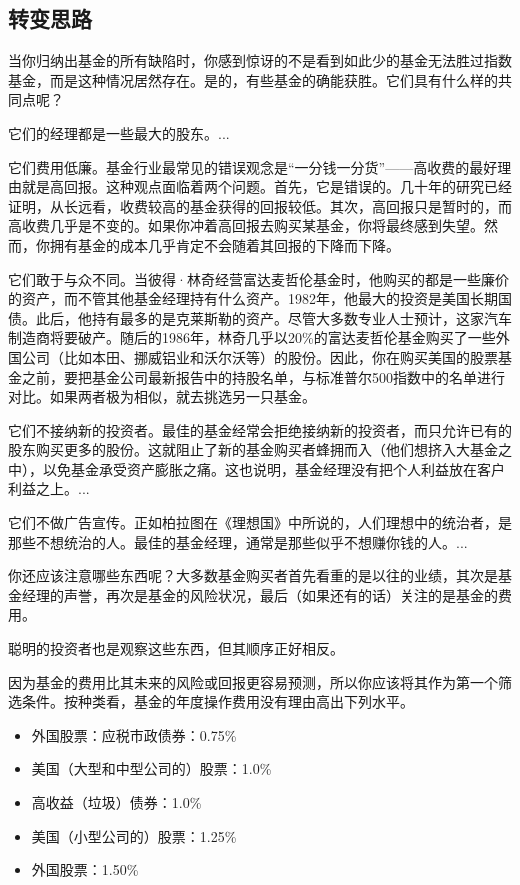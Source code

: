 \documentclass[12pt,oneside]{book}
\begin{document}
\subsection{转变思路}
当你归纳出基金的所有缺陷时，你感到惊讶的不是看到如此少的基金无法胜过指数基金，而是这种情况居然存在。是的，有些基金的确能获胜。它们具有什么样的共同点呢？

它们的经理都是一些最大的股东。...

它们费用低廉。基金行业最常见的错误观念是“一分钱一分货”——高收费的最好理由就是高回报。这种观点面临着两个问题。首先，它是错误的。几十年的研究已经证明，从长远看，收费较高的基金获得的回报较低。其次，高回报只是暂时的，而高收费几乎是不变的。如果你冲着高回报去购买某基金，你将最终感到失望。然而，你拥有基金的成本几乎肯定不会随着其回报的下降而下降。

它们敢于与众不同。当彼得·林奇经营富达麦哲伦基金时，他购买的都是一些廉价的资产，而不管其他基金经理持有什么资产。1982年，他最大的投资是美国长期国债。此后，他持有最多的是克莱斯勒的资产。尽管大多数专业人士预计，这家汽车制造商将要破产。随后的1986年，林奇几乎以20\%的富达麦哲伦基金购买了一些外国公司（比如本田、挪威铝业和沃尔沃等）的股份。因此，你在购买美国的股票基金之前，要把基金公司最新报告中的持股名单，与标准普尔500指数中的名单进行对比。如果两者极为相似，就去挑选另一只基金。

它们不接纳新的投资者。最佳的基金经常会拒绝接纳新的投资者，而只允许已有的股东购买更多的股份。这就阻止了新的基金购买者蜂拥而入（他们想挤入大基金之中），以免基金承受资产膨胀之痛。这也说明，基金经理没有把个人利益放在客户利益之上。...

它们不做广告宣传。正如柏拉图在《理想国》中所说的，人们理想中的统治者，是那些不想统治的人。最佳的基金经理，通常是那些似乎不想赚你钱的人。...

你还应该注意哪些东西呢？大多数基金购买者首先看重的是以往的业绩，其次是基金经理的声誉，再次是基金的风险状况，最后（如果还有的话）关注的是基金的费用。

聪明的投资者也是观察这些东西，但其顺序正好相反。

因为基金的费用比其未来的风险或回报更容易预测，所以你应该将其作为第一个筛选条件。按种类看，基金的年度操作费用没有理由高出下列水平。

\begin{itemize}
\item 外国股票：应税市政债券：0.75\%
\item 美国（大型和中型公司的）股票：1.0\%
\item 高收益（垃圾）债券：1.0\%
\item 美国（小型公司的）股票：1.25\%
\item 外国股票：1.50\%
\end{itemize}
\end{document}
